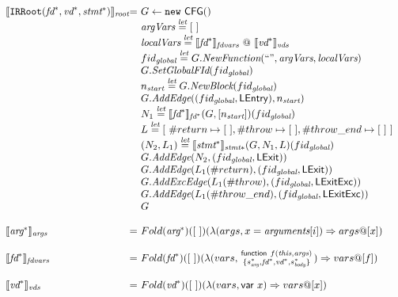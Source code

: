 \[
\begin{array}{l@{}l@{~}l}

\transfun{\TT{IRRoot}(\emph{fd}^*, \emph{vd}^*, \emph{stmt}^*)}_{\emph{root}} & = &
	G \leftarrow \TT{new}\ \CFG{\tt()}\\
	& & \argVars \letval [\ ] \\
	& & \localVars \letval \transfun{\emph{fd}^*}_{\emph{fdvars}} ~@~ \transfun{\emph{vd}^*}_{\emph{vds}} \\
	& & fid_{\emph{global}} \letval G.\emph{NewFunction}(`` ", \argVars, \localVars)\\
	& & G.\emph{SetGlobalFId}(fid_{\emph{global}}) \\
	& & n_{\emph{start}} \letval G.\emph{NewBlock}(fid_{\emph{global}})\\
	& & G.\emph{AddEdge}((fid_{\emph{global}},\LEntry), n_{\emph{start}})\\
	& & N_1 \letval \transfun{\emph{fd}^*}_{\emph{fd}^*}(G,[n_{\emph{start}}])(fid_{\emph{global}})\\
	& & L \letval [\ \#return \mapsto [\ ], \#throw \mapsto [\ ] , \#throw\_end \mapsto [\ ]\ ] \\
	& & (N_2,L_1) \letval \transfun{\emph{stmt}^*}_{\emph{stmt}*}(G,N_1,L)(fid_{\emph{global}})\\
	& & G.\emph{AddEdge}(N_2,(fid_{\emph{global}},\LExit))\\
	& & G.\emph{AddEdge}(L_1(\#return),(fid_{\emph{global}},\LExit))\\
	& & G.\emph{AddExcEdge}(L_1(\#throw),(fid_{\emph{global}},\LExitExc))\\
	& & G.\emph{AddEdge}(L_1(\#throw\_end),(fid_{\emph{global}},\LExitExc))\\
	& & G\\
	& & \\

\transfun{\emph{arg}^*}_{\emph{args}} & = &
	Fold(\emph{arg}^*)([\ ])(\lambda(args, x = \emph{arguments}[i])\Rightarrow args @ [x])\\
	& & \\

\transfun{\emph{fd}^*}_{\emph{fdvars}} & = &
	Fold(\emph{fd}^*)([\ ])(\lambda(vars, \irfundeclsmall{f}{\emph{this}}{\emph{args}}{s_{\emph{arg}}^*}{\emph{fd}^*}{\emph{vd}^*}{s_{\emph{body}}^*})\Rightarrow vars @ [f])\\
	& & \\

\transfun{\emph{vd}^*}_{\emph{vds}} & = &
	Fold(\emph{vd}^*)([\ ])(\lambda(vars, \irvar{x})\Rightarrow vars @ [x])\\
	& & \\


\end{array}\]
